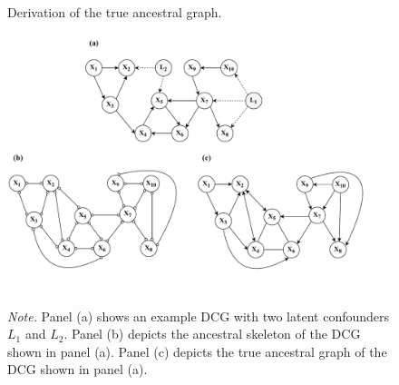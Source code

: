\documentclass[twoside, 11pt]{article}
\newcommand{\tailarrow}{%
\begin{tikzpicture}
    \draw [-{Straight Barb[length=2.5pt]}](0,0) -- (0.4, 0);
\end{tikzpicture}
}
\newcommand{\arrowarrow}{%
\begin{tikzpicture}
    \draw [{Straight Barb[length=2.5pt]}-{Straight Barb[length=2.5pt]}](0,0) -- (0.4, 0);
\end{tikzpicture}
}
\newcommand*{\figref}[2][]{%
  \hyperref[{fig:#2}]{%
    Figure~\ref*{fig:#2}%
    \ifx\\#1\\%
    \else
      #1%
    \fi
  }%
}
\begin{document}
\begin{appendices}



\begin{figure}[H]
    \centering
        \caption{Derivation of the true ancestral graph.}
        \includegraphics[width=1\textwidth]{figures/FigE1.pdf}
        \caption*{\small{\textit{Note.} Panel (a) shows an example DCG with two latent confounders $L_1$ and $L_2$. Panel (b) depicts the ancestral skeleton of the DCG shown in panel (a). Panel (c) depicts the true ancestral graph of the DCG shown in panel (a).}}
        \vspace{1mm}
    \label{fig:D1}
\end{figure}




\end{appendices}
\end{document}
